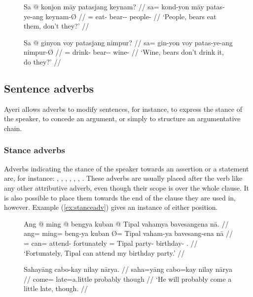 \begin{figure}[h]
\pex
\a\label{ex:posexpect}\begingl
	\gla Sa @ konjon māy patasjang keynam? //
	\glb sa= kond-yon māy patas-ye-ang keynam-Ø //
	\glc \PatT{}= eat-\TplN{} \Aff{} bear-\Pl{}-\Aarg{} people-\Top{} //
	\glft `People, bears eat them, don't they?' //
\endgl

\a\label{ex:negexpect}\begingl
	\gla Sa @ ginyon voy patasjang nimpur? //
	\glb sa= gin-yon voy patas-ye-ang nimpur-Ø //
	\glc \PatT{}= drink-\TplN{} \Neg{} bear-\Pl{}-\Aarg{} wine-\Top{} //
	\glft `Wine, bears don't drink it, do they?' //
\endgl
\xe
\end{figure}


\subsection{Sentence adverbs}

Ayeri allows adverbs to modify sentences, for instance, to express the stance
of the speaker, to concede an argument, or simply to structure an argumentative
chain.

\subsubsection{Stance adverbs}

Adverbs indicating the stance of the speaker towards an assertion or a 
statement are, for instance:
, 
,
,
,
,
,
.
These adverbs are usually placed after the verb like any other attributive 
adverb, even though their scope is over the whole clause. It is also possible 
to place them towards the end of the clause they are used in, however. Example 
(\ref{ex:stanceadv}) gives an instance of either position.

\begin{figure}[h]
\pex\label{ex:stanceadv}
\a\begingl
	\gla Ang @ ming @ bengya kuban {} @ Tipal vahamya bavesangena nā. //
	\glb ang= ming= beng-ya kuban Ø= Tipal vaham-ya bavesang-ena nā //
	\glc \AgtT{}= can= attend-\TsgM{} fortunately \Top{}= Tipal party-\Loc{} 
		birthday-\Gen{} \Fsg{}.\Gen{} //
	\glft `Fortunately, Tipal can attend my birthday party.' //
\endgl

\a\label{ex:naaryaadv}\begingl
	\gla Sahayāng cabo-kay nilay nārya. //
	\glb saha=yāng cabo=kay nilay nārya //
	\glc come=\TsgM{} late=a.little probably though //
	\glft `He will probably come a little late, though. //
\endgl
\xe
\end{figure}

